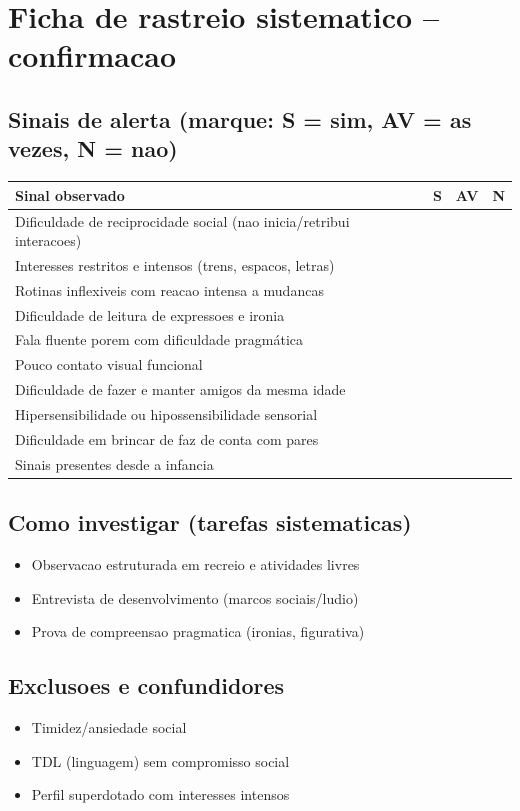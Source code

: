 \documentclass[a4paper,11pt]{book}
\begin{document}
\section*{Ficha de rastreio sistematico -- confirmacao}
\subsection*{Sinais de alerta (marque: S = sim, AV = as vezes, N = nao)}
\begin{tabular}{@{}p{11.5cm}ccc@{}}\toprule
Sinal observado & S & AV & N \\\midrule
Dificuldade de reciprocidade social (nao inicia/retribui interacoes) & & & \\
Interesses restritos e intensos (trens, espacos, letras) & & & \\
Rotinas inflexiveis com reacao intensa a mudancas & & & \\
Dificuldade de leitura de expressoes e ironia & & & \\
Fala fluente porem com dificuldade pragmática & & & \\
Pouco contato visual funcional & & & \\
Dificuldade de fazer e manter amigos da mesma idade & & & \\
Hipersensibilidade ou hipossensibilidade sensorial & & & \\
Dificuldade em brincar de faz de conta com pares & & & \\
Sinais presentes desde a infancia & & & \\
\bottomrule\end{tabular}
\subsection*{Como investigar (tarefas sistematicas)}
\begin{itemize}
\item Observacao estruturada em recreio e atividades livres
\item Entrevista de desenvolvimento (marcos sociais/ludio)
\item Prova de compreensao pragmatica (ironias, figurativa)
\end{itemize}
\subsection*{Exclusoes e confundidores}
\begin{itemize}
\item Timidez/ansiedade social
\item TDL (linguagem) sem compromisso social
\item Perfil superdotado com interesses intensos
\end{itemize}
\end{document}
